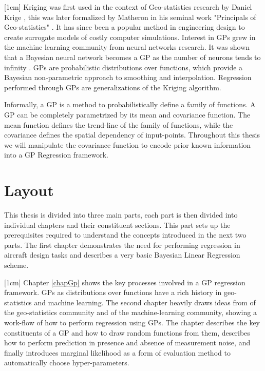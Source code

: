 [1cm]
Kriging was first used in the context of Geo-statistics research by Daniel Krige \cite{krige1951statistical}, this was later formalized by Matheron in his seminal work "Principals of Geo-statistics" \cite{matheron1963principles}. It has since been a popular method in engineering design to create surrogate models of costly computer simulations. Interest in GPs grew in the machine learning community from neural networks research. It was shown that a Bayesian neural network becomes a GP as the number of neurons tends to infinity \cite{neal2012bayesian}. GPs are probabilistic distributions over functions, which provide a Bayesian non-parametric approach to smoothing and interpolation. Regression performed through GPs are generalizations of the Kriging algorithm. 

Informally, a GP is a method to probabilistically define a family of functions. A GP can be completely parametrized by its mean and covariance function. The mean function defines the trend-line of the family of functions, while the covariance defines the spatial dependency of input-points. Throughout this thesis we will manipulate the covariance function to encode prior known information into a GP Regression framework. 

\section{Layout}\label{secOutline}
This thesis is divided into three main parts, each part is then divided into individual chapters and their constituent sections. This part sets up the prerequisites required to understand the concepts introduced in the next two parts. The first chapter demonstrates the need for performing regression in aircraft design tasks and describes a very basic Bayesian Linear Regression scheme. 

[1cm]
Chapter \ref{chapGp} shows the key processes involved in a GP regression framework. GPs as distributions over functions have a rich history in geo-statistics and machine learning. The second chapter heavily draws ideas from \cite{krige1951statistical, matheron1963principles} of the geo-statistics community and \cite{Stein1999Springer, kennedy2000predicting, Rasmussen2005, mackay2003information} of the machine-learning community, showing a work-flow of how to perform regression using GPs. The chapter describes the key constituents of a GP and how to draw random functions from them, describes how to perform prediction in presence and absence of measurement noise, and finally introduces marginal likelihood as a form of evaluation method to automatically choose hyper-parameters. 

